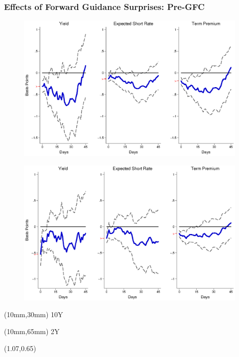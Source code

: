 \documentclass[12pt, aspectratio=169, xcolor=dvipsnames]{beamer}
\begin{document}
\begin{frame}[label=FGUSpre]
\frametitle{Effects of Forward Guidance Surprises: Pre-GFC}
\begin{figure}[!htbp]
	\begin{center} %
		\includegraphics[trim={0cm 0cm 0cm 0cm},clip,height=0.45\textheight,width=0.85\linewidth]{../Figures/LPs/LagDep-FX/Path/US/DCMP/PathUSDnomyptp120mPre.eps}
		\par\end{center}
\end{figure}
\vspace{-0.5cm}
\begin{figure}[!htbp]
	\begin{center} %
		\includegraphics[trim={0cm 0cm 0cm 0.76cm},clip,height=0.45\textheight,width=0.85\linewidth]{../Figures/LPs/LagDep-FX/Path/US/DCMP/PathUSDnomyptp24mPre.eps}
		\par\end{center}
\end{figure}
\begin{textblock*}{8mm}(10mm,30mm)
	\small 10Y
\end{textblock*}
\begin{textblock*}{8mm}(10mm,65mm)
	\small 2Y
\end{textblock*}
\begin{textblock*}{5cm}(1.07\textwidth,0.65\textheight)
	\hyperlink{FGEMpre}{}
\end{textblock*}
\end{frame}
\end{document}
